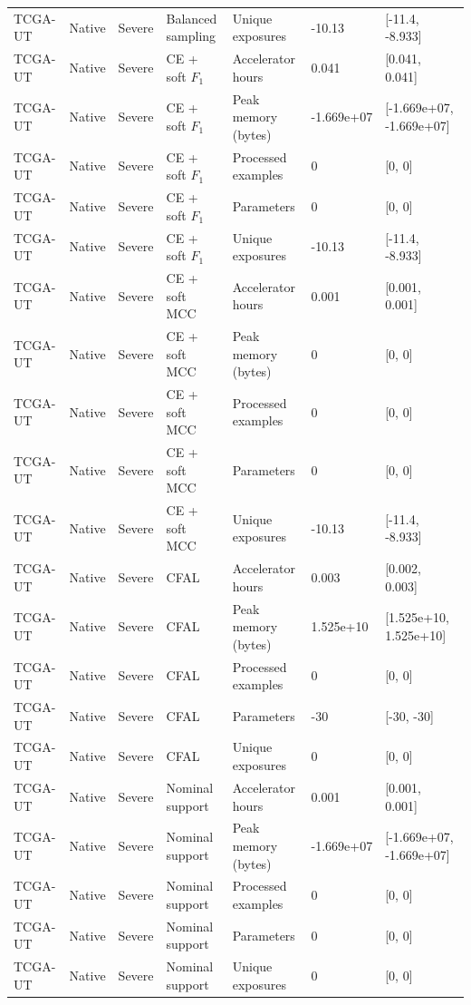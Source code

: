 \begin{longtable}{lllllll}
TCGA-UT & Native & Severe & Balanced sampling & Unique exposures & -10.13 & [-11.4, -8.933] \\
TCGA-UT & Native & Severe & CE + soft $F_1$ & Accelerator hours & 0.041 & [0.041, 0.041] \\
TCGA-UT & Native & Severe & CE + soft $F_1$ & Peak memory (bytes) & -1.669e+07 & [-1.669e+07, -1.669e+07] \\
TCGA-UT & Native & Severe & CE + soft $F_1$ & Processed examples & 0 & [0, 0] \\
TCGA-UT & Native & Severe & CE + soft $F_1$ & Parameters & 0 & [0, 0] \\
TCGA-UT & Native & Severe & CE + soft $F_1$ & Unique exposures & -10.13 & [-11.4, -8.933] \\
TCGA-UT & Native & Severe & CE + soft MCC & Accelerator hours & 0.001 & [0.001, 0.001] \\
TCGA-UT & Native & Severe & CE + soft MCC & Peak memory (bytes) & 0 & [0, 0] \\
TCGA-UT & Native & Severe & CE + soft MCC & Processed examples & 0 & [0, 0] \\
TCGA-UT & Native & Severe & CE + soft MCC & Parameters & 0 & [0, 0] \\
TCGA-UT & Native & Severe & CE + soft MCC & Unique exposures & -10.13 & [-11.4, -8.933] \\
TCGA-UT & Native & Severe & CFAL & Accelerator hours & 0.003 & [0.002, 0.003] \\
TCGA-UT & Native & Severe & CFAL & Peak memory (bytes) & 1.525e+10 & [1.525e+10, 1.525e+10] \\
TCGA-UT & Native & Severe & CFAL & Processed examples & 0 & [0, 0] \\
TCGA-UT & Native & Severe & CFAL & Parameters & -30 & [-30, -30] \\
TCGA-UT & Native & Severe & CFAL & Unique exposures & 0 & [0, 0] \\
TCGA-UT & Native & Severe & Nominal support & Accelerator hours & 0.001 & [0.001, 0.001] \\
TCGA-UT & Native & Severe & Nominal support & Peak memory (bytes) & -1.669e+07 & [-1.669e+07, -1.669e+07] \\
TCGA-UT & Native & Severe & Nominal support & Processed examples & 0 & [0, 0] \\
TCGA-UT & Native & Severe & Nominal support & Parameters & 0 & [0, 0] \\
TCGA-UT & Native & Severe & Nominal support & Unique exposures & 0 & [0, 0] \\

\end{longtable}
